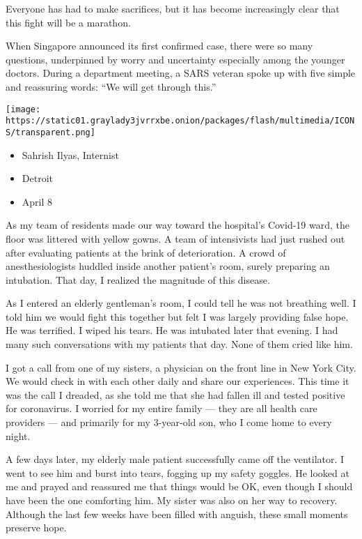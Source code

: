 Everyone has had to make sacrifices, but it has become increasingly
clear that this fight will be a marathon.

When Singapore announced its first confirmed case, there were so many
questions, underpinned by worry and uncertainty especially among the
younger doctors. During a department meeting, a SARS veteran spoke up
with five simple and reassuring words: ``We will get through this.''

\texttt{[image: https://static01.graylady3jvrrxbe.onion/packages/flash/multimedia/ICONS/transparent.png]}

\begin{itemize}
\tightlist
\item
  Sahrish Ilyas, Internist
\item
  Detroit
\item
  April 8
\end{itemize}

As my team of residents made our way toward the hospital's Covid-19
ward, the floor was littered with yellow gowns. A team of intensivists
had just rushed out after evaluating patients at the brink of
deterioration. A crowd of anesthesiologists huddled inside another
patient's room, surely preparing an intubation. That day, I realized the
magnitude of this disease.

As I entered an elderly gentleman's room, I could tell he was not
breathing well. I told him we would fight this together but felt I was
largely providing false hope. He was terrified. I wiped his tears. He
was intubated later that evening. I had many such conversations with my
patients that day. None of them cried like him.

I got a call from one of my sisters, a physician on the front line in
New York City. We would check in with each other daily and share our
experiences. This time it was the call I dreaded, as she told me that
she had fallen ill and tested positive for coronavirus. I worried for my
entire family --- they are all health care providers --- and primarily
for my 3-year-old son, who I come home to every night.

A few days later, my elderly male patient successfully came off the
ventilator. I went to see him and burst into tears, fogging up my safety
goggles. He looked at me and prayed and reassured me that things would
be OK, even though I should have been the one comforting him. My sister
was also on her way to recovery. Although the last few weeks have been
filled with anguish, these small moments preserve hope.

